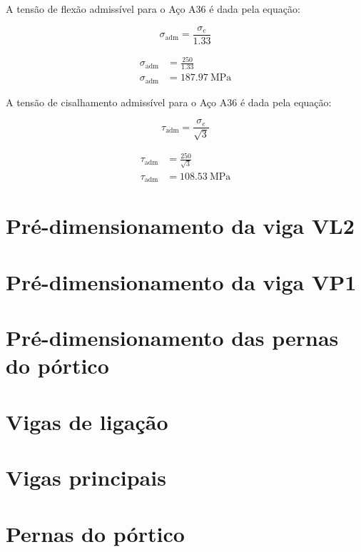 A tensão de flexão admissível para o Aço A36 é dada pela equação:

\begin{equation}
  \sigma_{\text{adm}} = \frac{\sigma_e}{\num{1.33}}
  \label{eq:tensao_admissivel_aco_a36}
\end{equation}

\begin{align*}
  \sigma_{\text{adm}} & = \frac{250}{\num{1.33}}            \\
  \sigma_{\text{adm}} & = \boxed{\SI{187.97}{\mega\pascal}}
\end{align*}

A tensão de cisalhamento admissível para o Aço A36 é dada pela equação:

\begin{equation}
  \tau_{\text{adm}} = \frac{\sigma_e}{\sqrt{3}}
  \label{eq:tensao_cisalhamento_admissivel_aco_a36}
\end{equation}

\begin{align*}
  \tau_{\text{adm}} & = \frac{250}{\sqrt{3}}              \\
  \tau_{\text{adm}} & = \boxed{\SI{108.53}{\mega\pascal}}
\end{align*}

\section{Pré-dimensionamento da viga VL2}


\section{Pré-dimensionamento da viga VP1}


\section{Pré-dimensionamento das pernas do pórtico}


\section{Vigas de ligação}


\section{Vigas principais}


\section{Pernas do pórtico}

